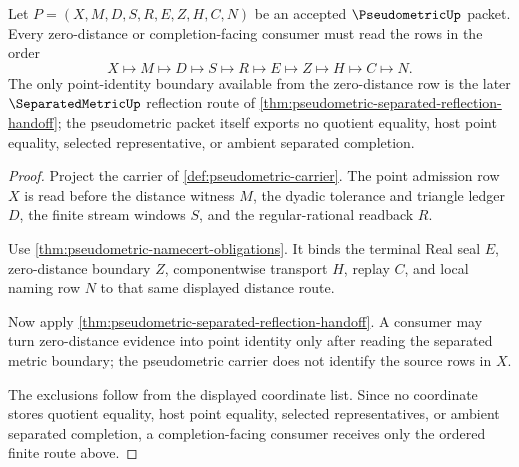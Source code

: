 \begin{theorem}
\label{thm:pseudometric-zero-distance-completion-route}
Let $P=(X,M,D,S,R,E,Z,H,C,N)$ be an accepted $\PseudometricUp$ packet. Every zero-distance or completion-facing consumer must read the rows in the order
$$
X\longmapsto M\longmapsto D\longmapsto S\longmapsto R\longmapsto E\longmapsto Z\longmapsto H\longmapsto C\longmapsto N .
$$
The only point-identity boundary available from the zero-distance row is the later $\SeparatedMetricUp$ reflection route of \autoref{thm:pseudometric-separated-reflection-handoff}; the pseudometric packet itself exports no quotient equality, host point equality, selected representative, or ambient separated completion.
\end{theorem}
\begin{proof}
Project the carrier of \autoref{def:pseudometric-carrier}. The point admission row $X$ is read before the distance witness $M$, the dyadic tolerance and triangle ledger $D$, the finite stream windows $S$, and the regular-rational readback $R$.

Use \autoref{thm:pseudometric-namecert-obligations}. It binds the terminal Real seal $E$, zero-distance boundary $Z$, componentwise transport $H$, replay $C$, and local naming row $N$ to that same displayed distance route.

Now apply \autoref{thm:pseudometric-separated-reflection-handoff}. A consumer may turn zero-distance evidence into point identity only after reading the separated metric boundary; the pseudometric carrier does not identify the source rows in $X$.

The exclusions follow from the displayed coordinate list. Since no coordinate stores quotient equality, host point equality, selected representatives, or ambient separated completion, a completion-facing consumer receives only the ordered finite route above.
\end{proof}

